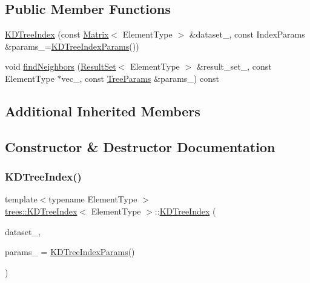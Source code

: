 \subsection*{Public Member Functions}
\begin{DoxyCompactItemize}
\item 
\hyperlink{classtrees_1_1_k_d_tree_index_abfde9fe47fe77c9fdde1af8d500b85e5}{K\+D\+Tree\+Index} (const \hyperlink{classtrees_1_1_matrix}{Matrix}$<$ Element\+Type $>$ \&dataset\+\_\+, const Index\+Params \&params\+\_\+=\hyperlink{structtrees_1_1_k_d_tree_index_params}{K\+D\+Tree\+Index\+Params}())
\item 
void \hyperlink{classtrees_1_1_k_d_tree_index_a37e551977e3c3f772846040819a12e8f}{find\+Neighbors} (\hyperlink{classtrees_1_1_result_set}{Result\+Set}$<$ Element\+Type $>$ \&result\+\_\+set\+\_\+, const Element\+Type $\ast$vec\+\_\+, const \hyperlink{structtrees_1_1_tree_params}{Tree\+Params} \&params\+\_\+) const
\end{DoxyCompactItemize}
\subsection*{Additional Inherited Members}


\subsection{Constructor \& Destructor Documentation}
\mbox{\label{classtrees_1_1_k_d_tree_index_abfde9fe47fe77c9fdde1af8d500b85e5}} 
\subsubsection{\texorpdfstring{K\+D\+Tree\+Index()}{KDTreeIndex()}}
{\footnotesize\ttfamily template$<$typename Element\+Type $>$ \\
\hyperlink{classtrees_1_1_k_d_tree_index}{trees\+::\+K\+D\+Tree\+Index}$<$ Element\+Type $>$\+::\hyperlink{classtrees_1_1_k_d_tree_index}{K\+D\+Tree\+Index} (\begin{DoxyParamCaption}\item[{const \hyperlink{classtrees_1_1_matrix}{Matrix}$<$ Element\+Type $>$ \&}]{dataset\+\_\+,  }\item[{const Index\+Params \&}]{params\+\_\+ = {\ttfamily \hyperlink{structtrees_1_1_k_d_tree_index_params}{K\+D\+Tree\+Index\+Params}()} }\end{DoxyParamCaption})\hspace{0.3cm}{\ttfamily [inline]}}

